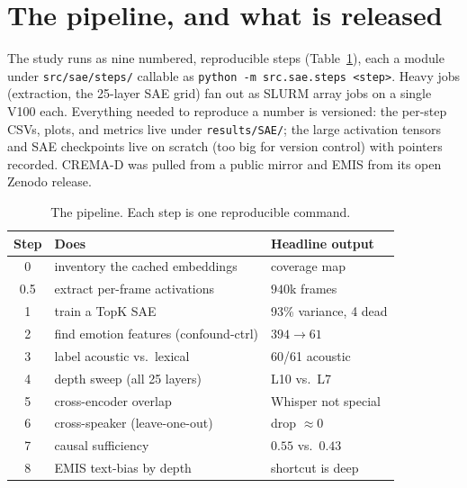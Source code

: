 \documentclass[sigconf,anonymous,nonacm]{acmart}
\begin{document}
\section{The pipeline, and what is released}
The study runs as nine numbered, reproducible steps (Table~\ref{tab:pipeline}), each a module under \texttt{src/sae/steps/} callable as \texttt{python -m src.sae.steps <step>}. Heavy jobs (extraction, the 25-layer SAE grid) fan out as SLURM array jobs on a single V100 each. Everything needed to reproduce a number is versioned: the per-step CSVs, plots, and metrics live under \texttt{results/SAE/}; the large activation tensors and SAE checkpoints live on scratch (too big for version control) with pointers recorded. CREMA-D was pulled from a public mirror and EMIS from its open Zenodo release.

\begin{table}[b]
\caption{The pipeline. Each step is one reproducible command.}
\label{tab:pipeline}\small
\begin{tabular}{cll}
\toprule
Step & Does & Headline output \\ \midrule
0 & inventory the cached embeddings & coverage map \\
0.5 & extract per-frame activations & $940$k frames \\
1 & train a TopK SAE & 93\% variance, 4 dead \\
2 & find emotion features (confound-ctrl) & $394\to61$ \\
3 & label acoustic vs.\ lexical & 60/61 acoustic \\
4 & depth sweep (all 25 layers) & L10 vs.\ L7 \\
5 & cross-encoder overlap & Whisper not special \\
6 & cross-speaker (leave-one-out) & drop $\approx 0$ \\
7 & causal sufficiency & $0.55$ vs.\ $0.43$ \\
8 & EMIS text-bias by depth & shortcut is deep \\
\bottomrule
\end{tabular}
\end{table}
\end{document}
